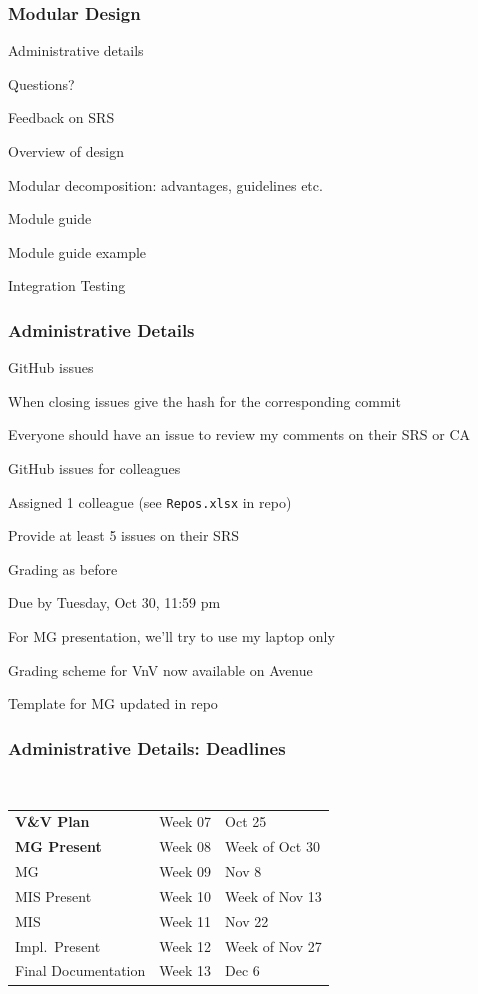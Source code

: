 \documentclass[t,12pt,numbers,fleqn]{beamer}
\begin{document}



\begin{frame}
\frametitle{Modular Design}

\bi
\item Administrative details
\item Questions?
\item Feedback on SRS
\item Overview of design
\item Modular decomposition: advantages, guidelines etc.
\item Module guide
\item Module guide example
\item Integration Testing 
\ei
\end{frame}


\begin{frame}
\frametitle{Administrative Details}

\bi
\item GitHub issues
\bi
\item When closing issues give the hash for the corresponding commit
\item Everyone should have an issue to review my comments on their SRS or CA
\ei
\item GitHub issues for colleagues
\bi
\item Assigned 1 colleague (see \texttt{Repos.xlsx} in repo)
\item Provide at least 5 issues on their SRS
\item Grading as before
\item Due by Tuesday, Oct 30, 11:59 pm
\ei

\item For MG presentation, we'll try to use my laptop only
\item Grading scheme for VnV now available on Avenue
\item Template for MG updated in repo
\ei

\end{frame}


\begin{frame}
\frametitle{Administrative Details: Deadlines}
~\newline
\begin{tabular}{l l l}
\textbf{V\&V Plan} & Week 07 & Oct 25\\
\textbf{MG Present} & Week 08 & Week of Oct 30\\
MG & Week 09 & Nov 8\\
MIS Present & Week 10 & Week of Nov 13\\
MIS & Week 11 & Nov 22\\
Impl.\ Present & Week 12 & Week of Nov 27\\
Final Documentation & Week 13 & Dec 6\\
\end {tabular}

\end{frame}
\end{document}
